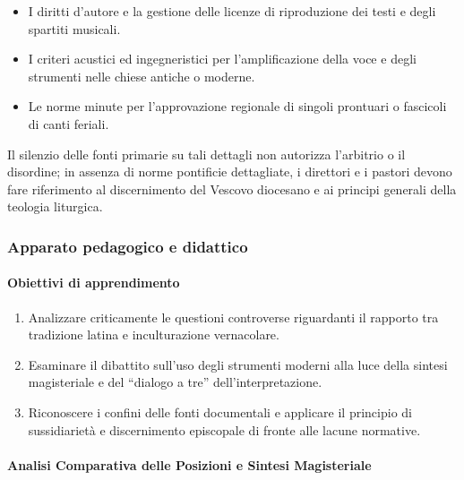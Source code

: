\documentclass[12pt,a4paper]{article}
\begin{document}
	\begin{itemize}[leftmargin=*]
		\item I diritti d'autore e la gestione delle licenze di riproduzione dei testi e degli spartiti musicali.
		\item I criteri acustici ed ingegneristici per l'amplificazione della voce e degli strumenti nelle chiese antiche o moderne.
		\item Le norme minute per l'approvazione regionale di singoli prontuari o fascicoli di canti feriali.
	\end{itemize}
	
	Il silenzio delle fonti primarie su tali dettagli non autorizza l'arbitrio o il disordine; in assenza di norme pontificie dettagliate, i direttori e i pastori devono fare riferimento al discernimento del Vescovo diocesano e ai principi generali della teologia liturgica.
	
	\subsubsection{Apparato pedagogico e didattico}\label{apparato-pedagogico-e-didattico-15}
	
	\paragraph{Obiettivi di apprendimento}\label{obiettivi-di-apprendimento-15}
	
	\begin{enumerate}[label=\arabic*.,leftmargin=*]
		\item Analizzare criticamente le questioni controverse riguardanti il rapporto tra tradizione latina e inculturazione vernacolare.
		\item Esaminare il dibattito sull'uso degli strumenti moderni alla luce della sintesi magisteriale e del ``dialogo a tre'' dell'interpretazione.
		\item Riconoscere i confini delle fonti documentali e applicare il principio di sussidiarietà e discernimento episcopale di fronte alle lacune normative.
	\end{enumerate}
	
	\paragraph{Analisi Comparativa delle Posizioni e Sintesi Magisteriale}\label{analisi-comparativa-delle-posizioni-e-sintesi-magisteriale}
	
\end{document}
